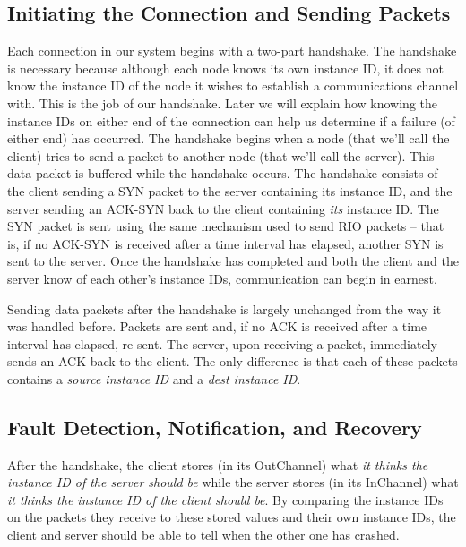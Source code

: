 \documentclass[12pt]{article}	%
\begin{document}
\subsection{Initiating the Connection and Sending Packets}

Each connection in our system begins with a two-part handshake. The handshake is necessary because although each node knows its own instance ID, it does not know the instance ID of the node it wishes to establish a communications channel with. This is the job of our handshake. Later we will explain how knowing the instance IDs on either end of the connection can help us determine if a failure (of either end) has occurred. The handshake begins when a node (that we'll call the client) tries to send a packet to another node (that we'll call the server). This data packet is buffered while the handshake occurs. The handshake consists of the client sending a SYN packet to the server containing its instance ID, and the server sending an ACK-SYN back to the client containing \emph{its} instance ID. The SYN packet is sent using the same mechanism used to send RIO packets -- that is, if no ACK-SYN is received after a time interval has elapsed, another SYN is sent to the server. Once the handshake has completed and both the client and the server know of each other's instance IDs, communication can begin in earnest.

Sending data packets after the handshake is largely unchanged from the way it was handled before. Packets are sent and, if no ACK is received after a time interval has elapsed, re-sent. The server, upon receiving a packet, immediately sends an ACK back to the client. The only difference is that each of these packets contains a \emph{source instance ID} and a \emph{dest instance ID}.

\subsection{Fault Detection, Notification, and Recovery}

After the handshake, the client stores (in its OutChannel) what \emph{it thinks the instance ID of the server should be} while the server stores (in its InChannel) what \emph{it thinks the instance ID of the client should be}. By comparing the instance IDs on the packets they receive to these stored values and their own instance IDs, the client and server should be able to tell when the other one has crashed.
\end{document}
